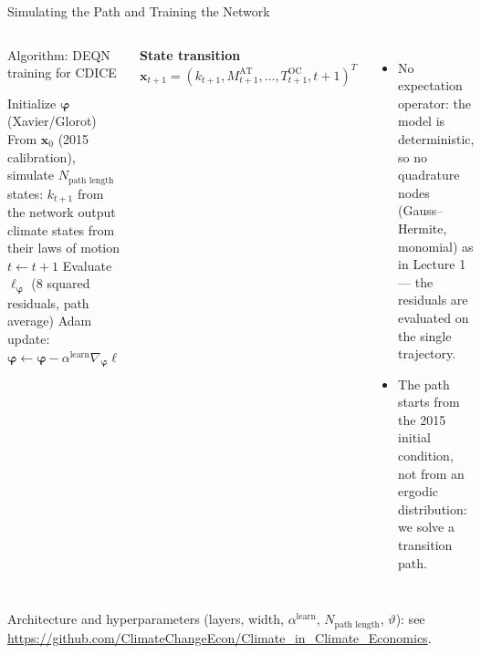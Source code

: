 \documentclass[aspectratio=169,11pt]{beamer}
\newcommand{\emphc}[1]{\textcolor{harvardcrimson}{#1}}
\newcommand{\x}{\bm{x}}
\begin{document}
\begin{frame}{Simulating the Path and Training the Network}
\small
\begin{columns}[T]
\begin{alertblock}{Algorithm: DEQN training for CDICE}
\begin{algorithmic}[1]
\STATE Initialize $\bm{\varphi}$ (Xavier/Glorot)
\REPEAT
\STATE From $\x_0$ (2015 calibration), simulate $N_{\text{path length}}$ states:
\STATE \quad $k_{t+1}$ from the network output
\STATE \quad climate states from their laws of motion
\STATE \quad $t \leftarrow t + 1$
\STATE Evaluate $\ell_{\bm{\varphi}}$ (8 squared residuals, path average)
\STATE Adam update: $\bm{\varphi} \leftarrow \bm{\varphi} - \alpha^{\text{learn}} \nabla_{\bm{\varphi}} \ell$
\UNTIL{$\ell_{\bm{\varphi}} < \epsilon$}
\end{algorithmic}
\end{alertblock}

\textbf{State transition}
\[
\x_{t+1} = \left(k_{t+1}, M^{\text{AT}}_{t+1}, \ldots, T^{\text{OC}}_{t+1}, t+1 \right)^T
\]
\begin{itemize}
    \item \emphc{No expectation operator}: the model is deterministic, so no quadrature nodes (Gauss--Hermite, monomial) as in Lecture 1 --- the residuals are evaluated on the single trajectory.
    \item The path starts from the \emphc{2015 initial condition}, not from an ergodic distribution: we solve a transition path.
\end{itemize}
\end{columns}

{\footnotesize Architecture and hyperparameters (layers, width, $\alpha^{\text{learn}}$, $N_{\text{path length}}$, $\vartheta$): see \url{https://github.com/ClimateChangeEcon/Climate_in_Climate_Economics}.}
\end{frame}
\end{document}
